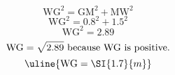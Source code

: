 \[\text{WG}^{2}=\text{GM}^{2}+\text{MW}^{2}\]
\[\text{WG}^{2}=0.8^{2}+1.5^{2}\]
\[\text{WG}^{2}=2.89\]
\[\text{WG}=\sqrt{\mathstrut 2.89}\text{ because WG is positive.}\]
\[\uline{\text{WG}=\SI{1.7}{m}}\]